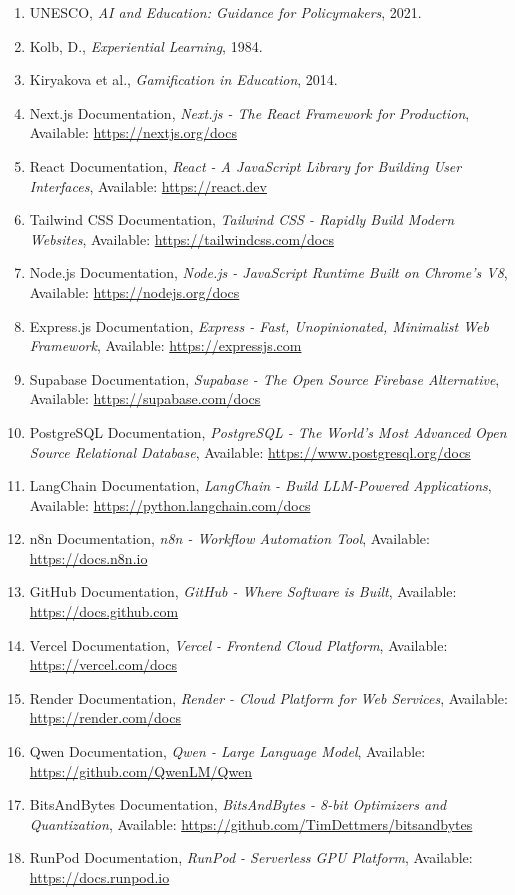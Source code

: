 \documentclass[12pt,a4paper]{report}
\begin{document}
\begin{enumerate}
    \item UNESCO, \textit{AI and Education: Guidance for Policymakers}, 2021.
    \item Kolb, D., \textit{Experiential Learning}, 1984.
    \item Kiryakova et al., \textit{Gamification in Education}, 2014.
    \item Next.js Documentation, \textit{Next.js - The React Framework for Production}, Available: \url{https://nextjs.org/docs}
    \item React Documentation, \textit{React - A JavaScript Library for Building User Interfaces}, Available: \url{https://react.dev}
    \item Tailwind CSS Documentation, \textit{Tailwind CSS - Rapidly Build Modern Websites}, Available: \url{https://tailwindcss.com/docs}
    \item Node.js Documentation, \textit{Node.js - JavaScript Runtime Built on Chrome's V8}, Available: \url{https://nodejs.org/docs}
    \item Express.js Documentation, \textit{Express - Fast, Unopinionated, Minimalist Web Framework}, Available: \url{https://expressjs.com}
    \item Supabase Documentation, \textit{Supabase - The Open Source Firebase Alternative}, Available: \url{https://supabase.com/docs}
    \item PostgreSQL Documentation, \textit{PostgreSQL - The World's Most Advanced Open Source Relational Database}, Available: \url{https://www.postgresql.org/docs}
    \item LangChain Documentation, \textit{LangChain - Build LLM-Powered Applications}, Available: \url{https://python.langchain.com/docs}
    \item n8n Documentation, \textit{n8n - Workflow Automation Tool}, Available: \url{https://docs.n8n.io}
    \item GitHub Documentation, \textit{GitHub - Where Software is Built}, Available: \url{https://docs.github.com}
    \item Vercel Documentation, \textit{Vercel - Frontend Cloud Platform}, Available: \url{https://vercel.com/docs}
    \item Render Documentation, \textit{Render - Cloud Platform for Web Services}, Available: \url{https://render.com/docs}
    \item Qwen Documentation, \textit{Qwen - Large Language Model}, Available: \url{https://github.com/QwenLM/Qwen}
    \item BitsAndBytes Documentation, \textit{BitsAndBytes - 8-bit Optimizers and Quantization}, Available: \url{https://github.com/TimDettmers/bitsandbytes}
    \item RunPod Documentation, \textit{RunPod - Serverless GPU Platform}, Available: \url{https://docs.runpod.io}
\end{enumerate}
\end{document}
